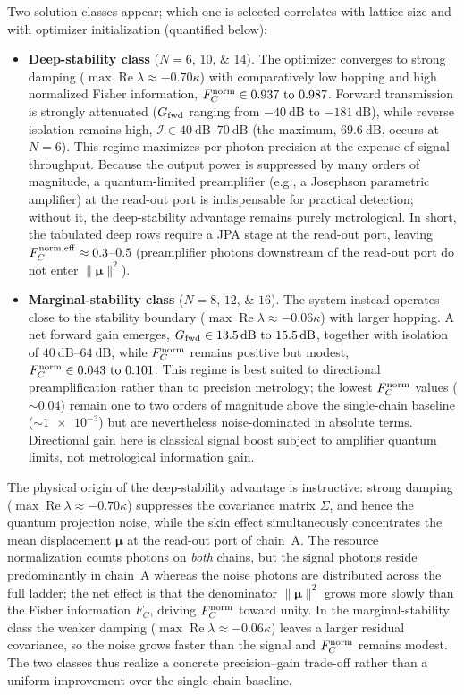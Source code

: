 \documentclass[aps,prxquantum,preprint,superscriptaddress,amsmath,amssymb]{revtex4-2}
\newcommand{\Real}{\operatorname{Re}}
\newcommand{\Fnorm}{F_C^{\rm norm}}
\newcommand{\Fnormeff}{F_C^{\rm norm,eff}}
\newcommand{\Gfwd}{G_{\rm fwd}}
\newcommand{\Iso}{\mathcal{I}}
\begin{document}
Two solution classes appear; which one is selected correlates with lattice size and with optimizer initialization (quantified below):
\begin{itemize}
\item \textbf{Deep-stability class} ($N=\numlist{6;10;14}$). The optimizer converges to strong damping ($\max\Real\lambda\approx\num{-0.70}\kappa$) with comparatively low hopping and high normalized Fisher information, $\Fnorm\in\numrange{0.937}{0.987}$. Forward transmission is strongly attenuated ($\Gfwd$ ranging from $\qty{-40}{\dB}$ to $\qty{-181}{\dB}$), while reverse isolation remains high, $\Iso\in\qtyrange{40}{70}{\dB}$ (the maximum, $\qty{69.6}{\dB}$, occurs at $N=\num{6}$). This regime maximizes per-photon precision at the expense of signal throughput. Because the output power is suppressed by many orders of magnitude, a quantum-limited preamplifier (e.g., a Josephson parametric amplifier) at the read-out port is indispensable for practical detection; without it, the deep-stability advantage remains purely metrological. In short, the tabulated deep rows require a JPA stage at the read-out port, leaving $\Fnormeff\approx\num{0.3}$--$\num{0.5}$ (preamplifier photons downstream of the read-out port do not enter $\|\bm{\mu}\|^2$).

\item \textbf{Marginal-stability class} ($N=\numlist{8;12;16}$). The system instead operates close to the stability boundary ($\max\Real\lambda\approx\num{-0.06}\kappa$) with larger hopping. A net forward gain emerges, $\Gfwd\in\qtyrange{13.5}{15.5}{\dB}$, together with isolation of $\qtyrange{40}{64}{\dB}$, while $\Fnorm$ remains positive but modest, $\Fnorm\in\numrange{0.043}{0.101}$. This regime is best suited to directional preamplification rather than to precision metrology; the lowest $\Fnorm$ values ($\sim\num{0.04}$) remain one to two orders of magnitude above the single-chain baseline ($\sim\num{1e-3}$) but are nevertheless noise-dominated in absolute terms. Directional gain here is classical signal boost subject to amplifier quantum limits, not metrological information gain.
\end{itemize}

The physical origin of the deep-stability advantage is instructive: strong damping ($\max\Real\lambda\approx\num{-0.70}\kappa$) suppresses the covariance matrix $\Sigma$, and hence the quantum projection noise, while the skin effect simultaneously concentrates the mean displacement $\bm{\mu}$ at the read-out port of chain~A. The resource normalization counts photons on \emph{both} chains, but the signal photons reside predominantly in chain~A whereas the noise photons are distributed across the full ladder; the net effect is that the denominator $\|\bm{\mu}\|^2$ grows more slowly than the Fisher information $F_C$, driving $\Fnorm$ toward unity. In the marginal-stability class the weaker damping ($\max\Real\lambda\approx\num{-0.06}\kappa$) leaves a larger residual covariance, so the noise grows faster than the signal and $\Fnorm$ remains modest. The two classes thus realize a concrete precision--gain trade-off rather than a uniform improvement over the single-chain baseline.
\end{document}
